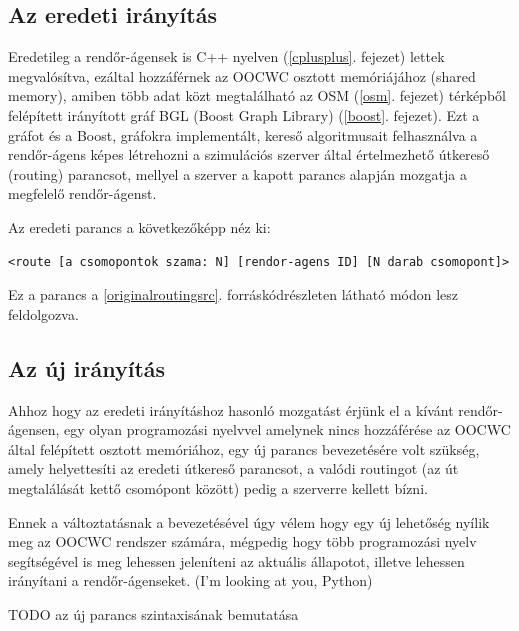\documentclass[a4paper,12pt]{report}
\begin{document}
\subsection{Az eredeti irányítás}
\label{originalrouting}

Eredetileg a rendőr-ágensek is C++ nyelven (\ref{cplusplus}. fejezet) lettek megvalósítva, ezáltal hozzáférnek az OOCWC osztott memóriájához (shared memory), amiben több adat közt megtalálható az OSM \citep{osm} (\ref{osm}. fejezet) térképből felépített irányított gráf BGL (Boost Graph Library) (\ref{boost}. fejezet). Ezt a gráfot és a Boost, gráfokra implementált, kereső algoritmusait felhasználva a rendőr-ágens képes létrehozni a szimulációs szerver által értelmezhető útkereső (routing) parancsot, mellyel a szerver a kapott parancs alapján mozgatja a megfelelő rendőr-ágenst. 

\vspace{2mm}
Az eredeti parancs a következőképp néz ki: 
\begin{lstlisting}
<route [a csomopontok szama: N] [rendor-agens ID] [N darab csomopont]>
\end{lstlisting}

Ez a parancs a \ref{originalroutingsrc}. forráskódrészleten látható módon lesz feldolgozva.



\subsection{Az új irányítás}
\label{newrouting}

Ahhoz hogy az eredeti irányításhoz hasonló mozgatást érjünk el a kívánt rendőr-ágensen, egy olyan programozási nyelvvel amelynek nincs hozzáférése az OOCWC által felépített osztott memóriához, egy új parancs bevezetésére volt szükség, amely helyettesíti az eredeti útkereső parancsot, a valódi routingot (az út megtalálását kettő csomópont között) pedig a szerverre kellett bízni.

\vspace{2mm}
Ennek a változtatásnak a bevezetésével úgy vélem hogy egy új lehetőség nyílik meg az OOCWC rendszer számára, mégpedig hogy több programozási nyelv segítségével is meg lehessen jeleníteni az aktuális állapotot, illetve lehessen irányítani a rendőr-ágenseket. (I'm looking at you, Python)

\vspace{2mm}
TODO az új parancs szintaxisának bemutatása
\end{document}
